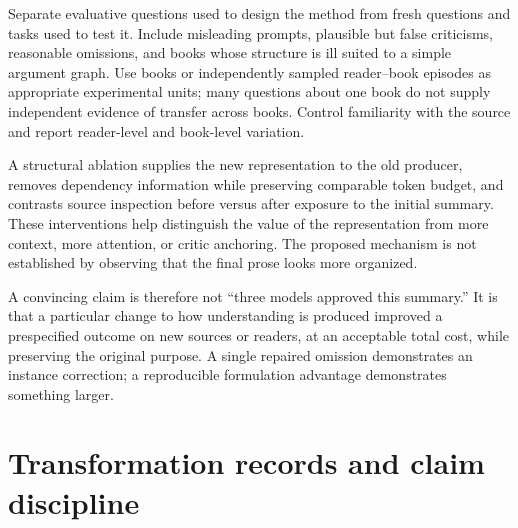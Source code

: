 \documentclass[11pt,letterpaper]{article}
\theoremstyle{remark}\newtheorem{remark}{Remark}[section]
\begin{document}
Separate evaluative questions used to design the method from fresh questions and tasks used to test it. Include misleading prompts, plausible but false criticisms, reasonable omissions, and books whose structure is ill suited to a simple argument graph. Use books or independently sampled reader--book episodes as appropriate experimental units; many questions about one book do not supply independent evidence of transfer across books. Control familiarity with the source and report reader-level and book-level variation.

A structural ablation supplies the new representation to the old producer, removes dependency information while preserving comparable token budget, and contrasts source inspection before versus after exposure to the initial summary. These interventions help distinguish the value of the representation from more context, more attention, or critic anchoring. The proposed mechanism is not established by observing that the final prose looks more organized.

A convincing claim is therefore not ``three models approved this summary.'' It is that a particular change to how understanding is produced improved a prespecified outcome on new sources or readers, at an acceptable total cost, while preserving the original purpose. A single repaired omission demonstrates an instance correction; a reproducible formulation advantage demonstrates something larger.

\section{Transformation records and claim discipline}
\label{app:records}
\end{document}
